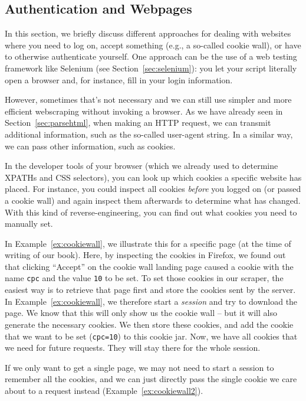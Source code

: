 \subsection{Authentication and Webpages}
\label{sec:authweb}
In this section, we briefly discuss different approaches for dealing
with websites where you need to log on, accept something (e.g., a
so-called cookie wall), or have to otherwise authenticate yourself.
One approach can be the use of a web testing framework like Selenium
(see Section~\ref{sec:selenium}): you let your script literally open a browser
and, for instance, fill in your login information.

However, sometimes that's not necessary and we can still use simpler
and more efficient webscraping without invoking a browser. As we have already
seen in Section~\ref{sec:parsehtml}, when making an HTTP request, we can transmit
additional information, such as the so-called user-agent string. In a
similar way, we can pass other information, such as cookies.

In the developer tools of your browser (which we already used to determine
XPATHs and CSS selectors), you can look up which cookies a specific website
has placed. For instance, you could inspect all cookies \emph{before} you
logged on (or passed a cookie wall) and again inspect them afterwards to
determine what has changed. With this kind of reverse-engineering, you
can find out what cookies you need to manually set.

In Example~\ref{ex:cookiewall}, we illustrate this for a specific page  (at the
time of writing of our book). Here, by inspecting the cookies in Firefox,
we found out that clicking ``Accept'' on the cookie wall landing page
caused a cookie with the name \verb|cpc| and the value \verb|10| to be set.   To set those cookies in our scraper, the easiest way is to retrieve that page first and store the cookies sent by the server. In Example~\ref{ex:cookiewall}, we therefore start a \emph{session}
and try to download the page. We know that this will only show us the
cookie wall -- but it will also generate the necessary cookies. We then
store these cookies, and add the cookie that we want to be set (\verb|cpc=10|)
to this cookie jar. Now, we have all cookies that we need for future
requests. They will stay there for the whole session.

If we only want to get a single page, we may not need to start a session
to remember all the cookies, and we can just directly pass the single
cookie we care about to a request instead (Example~\ref{ex:cookiewall2}).




